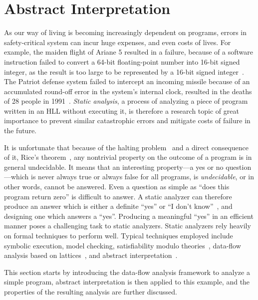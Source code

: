 \section{Abstract Interpretation}
\label{bg:sec:abstract_interpretation}

As our way of living is becoming increasingly dependent on programs, errors
in safety-critical system can incur huge expenses, and even costs of lives.
For example, the maiden flight of Ariane 5 resulted in a failure, because of
a software instruction failed to convert a 64-bit floating-point number into
16-bit signed integer, as the result is too large to be represented by a 16-bit
signed integer~\cite{dowson97}.  The Patriot defense system failed to intercept
an incoming missile because of an accumulated round-off error in the system's
internal clock, resulted in the deaths of 28 people in 1991~\cite{patriot}.
\emph{Static analysis}, a process of analyzing a piece of program written in
an HLL without executing it, is therefore a research topic of great importance
to prevent similar catastrophic errors and mitigate costs of failure in the
future.

It is unfortunate that because of the halting problem~\cite{turing37} and
a direct consequence of it, Rice's theorem~\cite{rice53}, any nontrivial
property on the outcome of a program is in general undecidable.  It means
that an interesting property---a yes or no question---which is never
always true or always false for all programs, is \emph{undecidable}, or
in other words, cannot be answered.  Even a question as simple as ``does
this program return zero'' is difficult to answer.  A static analyzer can
therefore produce an answer which is either a definite ``yes'' or ``I don't
know''~\cite{mine04}, and designing one which answers a ``yes''.  Producing a
meaningful ``yes'' in an efficient manner poses a challenging task to static
analyzers.  Static analyzers rely heavily on formal techniques to perform
well.  Typical techniques employed include symbolic execution, model checking,
satisfiability modulo theories~\cite{demoura08}, data-flow analysis based on
lattices~\cite{nielson99}, and abstract interpretation~\cite{cousot77}.

This section starts by introducing the data-flow analysis framework to analyze
a simple program, abstract interpretation is then applied to this example, and
the properties of the resulting analysis are further discussed.


